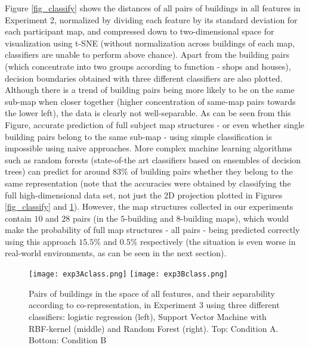 Figure \ref{fig_classify} shows the distances of all pairs of buildings in all features in Experiment 2, normalized by dividing each feature by its standard deviation for each participant map, and compressed down to two-dimensional space for visualization using t-SNE \citep{van2008visualizing} (without normalization across buildings of each map, classifiers are unable to perform above chance). Apart from the building pairs (which concentrate into two groups according to function - shops and houses), decision boundaries obtained with three different classifiers are also plotted. Although there is a trend of building pairs being more likely to be on the same sub-map when closer together (higher concentration of same-map pairs towards the lower left), the data is clearly not well-separable. As can be seen from this Figure, accurate prediction of full subject map structures - or even whether single building pairs belong to the same sub-map - using simple classification is impossible using naive approaches. More complex machine learning algorithms such as random forests (state-of-the art classifiers based on ensembles of decision trees) \citep{breiman2001random} can predict for around $83 \%$ of building pairs whether they belong to the same representation (note that the accuracies were obtained by classifying the full high-dimensional data set, not just the 2D projection plotted in Figures \ref{fig_classify} and \ref{fig_classify_rl}). However, the map structures collected in our experiments contain $10$ and $28$ pairs (in the $5$-building and $8$-building maps), which would make the probability of full map structures - all pairs - being predicted correctly using this approach $15.5 \%$ and $0.5 \%$ respectively (the situation is even worse in real-world environments, as can be seen in the next section).

\begin{figure}[h]
	\centering
	\texttt{[image: exp3Aclass.png]}
	\texttt{[image: exp3Bclass.png]}
	\caption{Pairs of buildings in the space of all features, and their separability according to co-representation, in Experiment 3 using three different classifiers: logistic regression (left), Support Vector Machine with RBF-kernel (middle) and Random Forest (right). Top: Condition A. Bottom: Condition B}
	\label{fig_classify_rl}
\end{figure}

